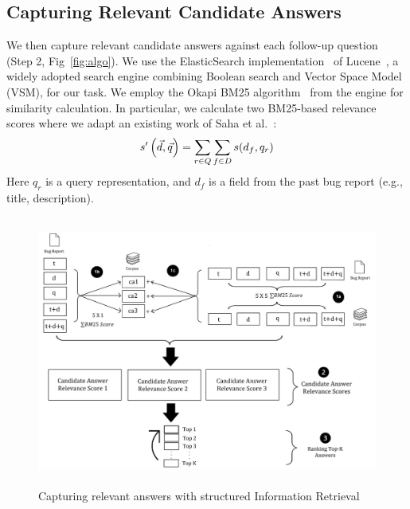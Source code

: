 \subsection{Capturing Relevant Candidate Answers}
\label{sec:proposedtechnique-relanswer}
We then capture relevant candidate answers against each follow-up question (Step 2, Fig~\ref{fig:algo}). We use the ElasticSearch implementation~\cite{ElasticSearch}
of Lucene~\cite{haiduc2013automatic,moreno2015query, mccandless2010lucene}, a widely adopted search engine combining Boolean search and Vector Space Model (VSM), for our task. We employ the Okapi BM25 algorithm~\cite{kamphuis2020bm25} from the engine for similarity calculation. In particular, we calculate two BM25-based relevance scores where we adapt an existing work of Saha et al.~\cite{saha2013improving}:
\vspace{-0.21cm}
\begin{equation}\label{bluir}
\vspace{-0.25cm}
  s'\left( \vec{d},\vec{q} \right) = \sum_{r\in Q}\sum_{f\in D}s(d_{f} , q_{r})
\end{equation}
Here $q_{r}$ is a query representation, and $d_{f}$ is a field from the past bug report (e.g., title, description).\par

\begin{figure}
 \includegraphics[width=\textwidth, height = 3.5in]{images/Capturing_Relevant_QA_Optimized.pdf}
	\caption{Capturing relevant answers with structured Information Retrieval}
	\label{fig:qa}
\end{figure}
